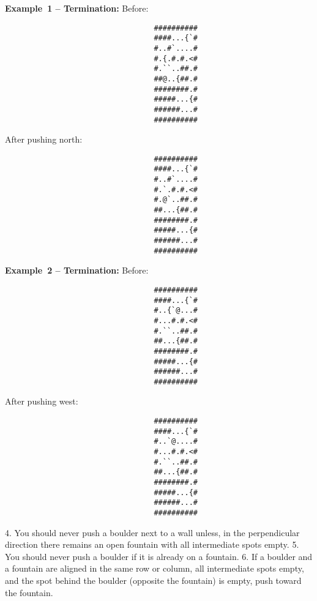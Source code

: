 \begin{MyGreenBox}[frametitle={\textbf{Iteration 2 MiniHack Prompt}}]
{\textbf{Example 1 – Termination:}  
Before:
\begin{verbatim}
                                  ##########
                                  ####...{`#
                                  #..#`....#
                                  #.{.#.#.<#
                                  #.``..##.#
                                  ##@..{##.#
                                  ########.#
                                  #####...{#
                                  ######...#
                                  ##########
\end{verbatim}
After pushing north:
\begin{verbatim}
                                  ##########
                                  ####...{`#
                                  #..#`....#
                                  #.`.#.#.<#
                                  #.@`..##.#
                                  ##...{##.#
                                  ########.#
                                  #####...{#
                                  ######...#
                                  ##########
\end{verbatim}

\textbf{Example 2 – Termination:}  
Before:
\begin{verbatim}
                                  ##########
                                  ####...{`#
                                  #..{`@...#
                                  #...#.#.<#
                                  #.``..##.#
                                  ##...{##.#
                                  ########.#
                                  #####...{#
                                  ######...#
                                  ##########
\end{verbatim}
After pushing west:
\begin{verbatim}
                                  ##########
                                  ####...{`#
                                  #..`@....#
                                  #...#.#.<#
                                  #.``..##.#
                                  ##...{##.#
                                  ########.#
                                  #####...{#
                                  ######...#
                                  ##########
\end{verbatim}

4. You should never push a boulder next to a wall unless, in the perpendicular direction there remains an open fountain with all intermediate spots empty.  
5. You should never push a boulder if it is already on a fountain.  
6. If a boulder and a fountain are aligned in the same row or column, all intermediate spots empty, and the spot behind the boulder (opposite the fountain) is empty, push toward the fountain.

}
\end{MyGreenBox}
